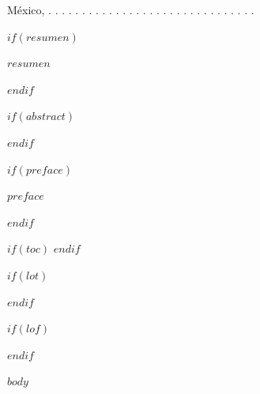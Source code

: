 \documentclass[12pt,twoside]{reedthesis}
\begin{document}
México, 
\vspace{3cm}
. . . . . . . . . . . . . . . . . . . . . . . . . . . . . . .



$if(resumen)$
  \begin{resumen}
    $resumen$
  \end{resumen}
$endif$

$if(abstract)$
  \begin{abstract}
    $abstract$
  \end{abstract}
$endif$

$if(preface)$
  \begin{preface}
    $preface$
  \end{preface}
$endif$

$if(toc)$
  \setcounter{tocdepth}{$toc-depth$}
  \tableofcontents
$endif$

$if(lot)$
  \listoftables
$endif$

$if(lof)$
  \listoffigures
$endif$

\mainmatter %
\pagestyle{fancyplain} %

$body$


\end{document}
